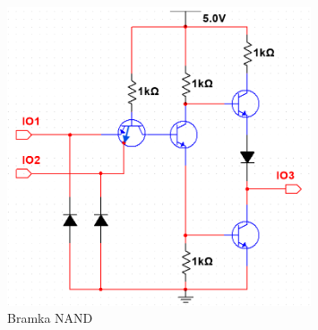 \documentclass{article}
\begin{document}
\begin{figure}[h]
    \centering
    \includegraphics[width=0.8\textwidth]{obwod1.PNG}
    \caption{Bramka NAND}
    \label{fig:moj_obrazek}
\end{figure}
\end{document}
